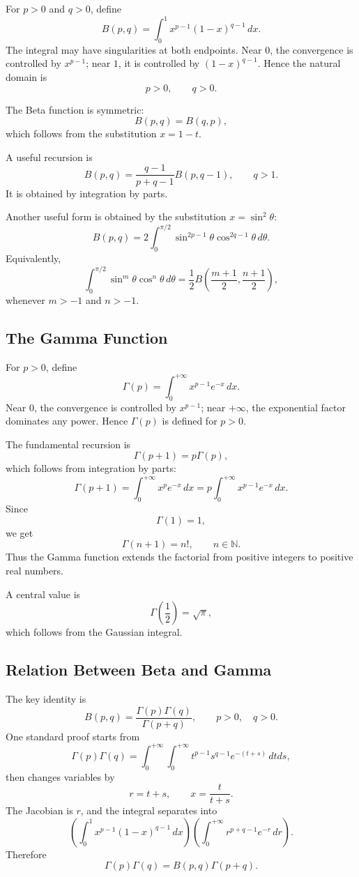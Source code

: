 For $p>0$ and $q>0$, define
\[
    B(p,q)=\int_0^1 x^{p-1}(1-x)^{q-1}\,dx.
\]
The integral may have singularities at both endpoints. Near $0$, the convergence is controlled by $x^{p-1}$; near $1$, it is controlled by $(1-x)^{q-1}$. Hence the natural domain is
\[
    p>0,
    \qquad
    q>0.
\]

The Beta function is symmetric:
\[
    B(p,q)=B(q,p),
\]
which follows from the substitution $x=1-t$.

A useful recursion is
\[
    B(p,q)=\frac{q-1}{p+q-1}B(p,q-1),
    \qquad q>1.
\]
It is obtained by integration by parts.

Another useful form is obtained by the substitution $x=\sin^2\theta$:
\[
    B(p,q)=2\int_0^{\pi/2}\sin^{2p-1}\theta\cos^{2q-1}\theta\,d\theta.
\]
Equivalently,
\[
    \int_0^{\pi/2}\sin^{m}\theta\cos^{n}\theta\,d\theta
    =\frac12 B\left(\frac{m+1}{2},\frac{n+1}{2}\right),
\]
whenever $m>-1$ and $n>-1$.

\subsection{The Gamma Function}

For $p>0$, define
\[
    \Gamma(p)=\int_0^{+\infty} x^{p-1}e^{-x}\,dx.
\]
Near $0$, the convergence is controlled by $x^{p-1}$; near $+\infty$, the exponential factor dominates any power. Hence $\Gamma(p)$ is defined for $p>0$.

The fundamental recursion is
\[
    \Gamma(p+1)=p\Gamma(p),
\]
which follows from integration by parts:
\[
    \Gamma(p+1)=\int_0^{+\infty}x^p e^{-x}\,dx
    =p\int_0^{+\infty}x^{p-1}e^{-x}\,dx.
\]
Since
\[
    \Gamma(1)=1,
\]
we get
\[
    \Gamma(n+1)=n!,
    \qquad n\in\mathbb N.
\]
Thus the Gamma function extends the factorial from positive integers to positive real numbers.

A central value is
\[
    \Gamma\left(\frac12\right)=\sqrt\pi,
\]
which follows from the Gaussian integral.

\subsection{Relation Between Beta and Gamma}

The key identity is
\[
    B(p,q)=\frac{\Gamma(p)\Gamma(q)}{\Gamma(p+q)},
    \qquad p>0,
    \quad q>0.
\]
One standard proof starts from
\[
    \Gamma(p)\Gamma(q)
    =\int_0^{+\infty}\int_0^{+\infty}
    t^{p-1}s^{q-1}e^{-(t+s)}\,dtds,
\]
then changes variables by
\[
    r=t+s,
    \qquad
    x=\frac{t}{t+s}.
\]
The Jacobian is $r$, and the integral separates into
\[
    \left(\int_0^1x^{p-1}(1-x)^{q-1}\,dx\right)
    \left(\int_0^{+\infty}r^{p+q-1}e^{-r}\,dr\right).
\]
Therefore
\[
    \Gamma(p)\Gamma(q)=B(p,q)\Gamma(p+q).
\]

